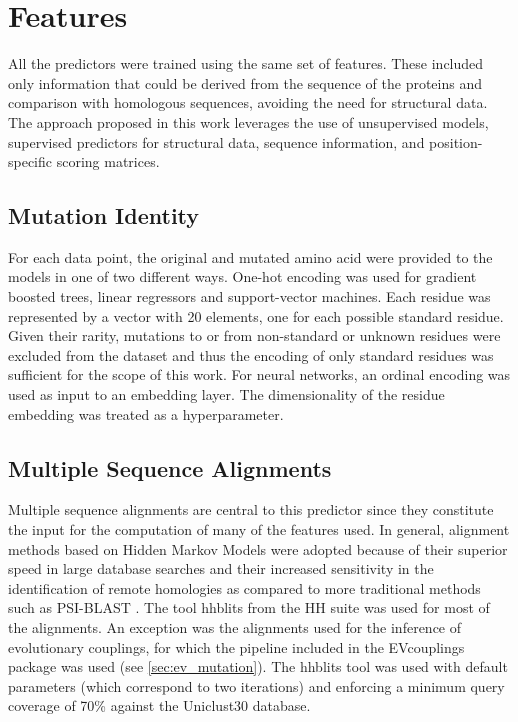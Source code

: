 \FloatBarrier%
\section{Features}
All the predictors were trained using the same set of features.
These included only information that could be derived from the sequence of the proteins and comparison with homologous sequences, avoiding the need for structural data.
The approach proposed in this work leverages the use of unsupervised models, supervised predictors for structural data, sequence information, and position-specific scoring matrices.

\subsection{Mutation Identity}
For each data point, the original and mutated amino acid were provided to the models in one of two different ways.
One-hot encoding was used for gradient boosted trees, linear regressors and support-vector machines.
Each residue was represented by a vector with 20 elements, one for each possible standard residue.
Given their rarity, mutations to or from non-standard or unknown residues were excluded from the dataset and thus the encoding of only standard residues was sufficient for the scope of this work.
For neural networks, an ordinal encoding was used as input to an embedding layer.
The dimensionality of the residue embedding was treated as a hyperparameter.

\subsection{Multiple Sequence Alignments}\label{sec:msa}
Multiple sequence alignments are central to this predictor since they constitute the input for the computation of many of the features used.
In general, alignment methods based on Hidden Markov Models were adopted because of their superior speed in large database searches and their increased sensitivity in the identification of remote homologies as compared to more traditional methods such as PSI-BLAST \parencite[see the introduction of][and references therein]{Steinegger2019}.
The tool hhblits from the HH suite was used for most of the alignments.
An exception was the alignments used for the inference of evolutionary couplings, for which the pipeline included in the EVcouplings package was used (see \cref{sec:ev_mutation}).
The hhblits tool was used with default parameters (which correspond to two iterations) and enforcing a minimum query coverage of 70\% against the Uniclust30 database.


